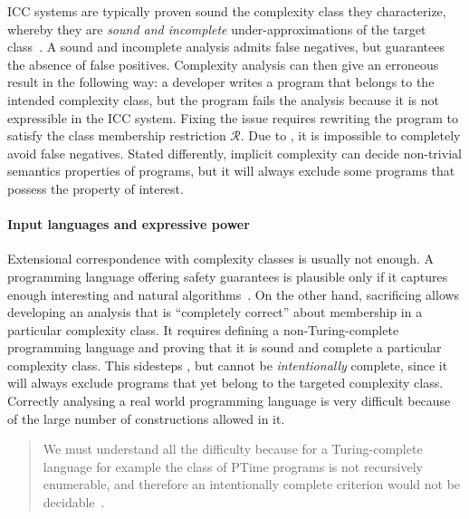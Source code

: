 ICC systems are typically proven sound \wrt the complexity class they
characterize, whereby they are \emph{sound and incomplete} under-approximations
of the target class~\cite[p. 125]{moyen2017}. A sound and incomplete analysis
admits false negatives, but guarantees the absence of false positives.
Complexity analysis can then give an erroneous result
in the following way: a developer writes a program that belongs to the intended
complexity class, but the program fails the analysis
because it is not expressible in the ICC system.
Fixing the issue requires rewriting the program to satisfy the class membership
restriction \(\mathcal{R}\). Due to , it
is impossible to completely avoid false negatives. Stated differently, implicit
complexity can decide non-trivial semantics properties of programs, but it will
always exclude some programs that possess the property of interest.

\paragraph*{Input languages and expressive power}
Extensional correspondence with complexity
classes is usually not enough. A programming language offering safety guarantees
is plausible only if it captures enough interesting and natural
algorithms~\cite{baillot2012}. On the other hand, sacrificing
 allows developing an analysis that is
\enquote{completely correct} about membership in a particular complexity
class. It requires defining a non-Turing-complete
programming language and proving that it is sound and
complete \wrt a particular complexity
class. This sidesteps , but cannot
be \emph{intentionally} complete, since it will always exclude programs that yet
belong to the targeted complexity class. Correctly
analysing a real world programming language is very difficult because of the
large number of constructions allowed in it.

\begin{quotation}
\noindent We must understand all the diﬃculty because for a
Turing-complete language for example the class of
PTime programs is not recursively enumerable, and therefore an
intentionally complete criterion would not be decidable~\cite[Sect.
4.1]{mogbil2012}.
\end{quotation}

